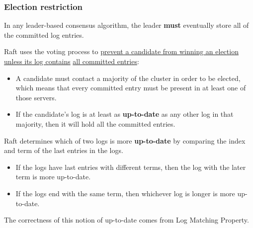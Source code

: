 \documentclass[11pt]{article}
\begin{document}
\subsubsection{Election restriction}
\label{sec:org459241d}
In any leader-based consensus algorithm, the leader \textbf{must} eventually store all of the committed log
entries.

Raft uses the voting process to \uline{prevent a candidate from winning an election unless its log contains}
\uline{all committed entries}:
\begin{itemize}
\item A candidate must contact a majority of the cluster in order to be elected, which means that every
committed entry must be present in at least one of those servers.
\item If the candidate's log is at least as \textbf{up-to-date} as any other log in that majority, then it will
hold all the committed entries.
\end{itemize}

Raft determines which of two logs is more \textbf{up-to-date} by comparing the index and term of the last
entries in the logs.
\begin{itemize}
\item If the logs have last entries with different terms, then the log with the later term is more up-to-date.
\item If the logs end with the same term, then whichever log is longer is more up-to-date.
\end{itemize}

The correctness of this notion of up-to-date comes from Log Matching Property.
\end{document}
